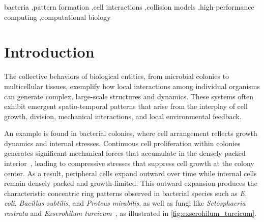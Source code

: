 \documentclass[a4paper,fleqn]{cas-dc}
\begin{document}


\begin{keywords}
    bacteria \sep pattern formation \sep cell interactions \sep collision models \sep high-performance computing \sep computational biology
\end{keywords}

\maketitle





\section{Introduction}

The collective behaviors of biological entities, from microbial colonies to multicellular tissues, exemplify how local interactions among individual organisms can generate complex, large-scale structures and dynamics. These systems often exhibit emergent spatio-temporal patterns that arise from the interplay of cell growth, division, mechanical interactions, and local environmental feedback.

An example is found in bacterial colonies, where cell arrangement reflects growth dynamics and internal stresses. Continuous cell proliferation within colonies generates significant mechanical forces that accumulate in the densely packed interior~\cite{Wittmann2023}, leading to compressive stresses that suppress cell growth at the colony center. As a result, peripheral cells expand outward over time while internal cells remain densely packed and growth-limited. This outward expansion produces the characteristic concentric ring patterns observed in bacterial species such as \textit{E. coli}, \textit{Bacillus subtilis}, and \textit{Proteus mirabilis}, as well as fungi like \textit{Setosphaeria rostrata} and \textit{Exserohilum turcicum}~\cite{YAMAZAKI2005136}, as illustrated in \autoref{fig:exserohilum_turcicum}.
\end{document}
